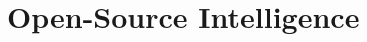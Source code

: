 \begin{comment}
    \item Building on epistemic asymmetry, \textit{technocratic dominance} occurs when a person or a group that has a high level of technical knowledge uses that knowledge to affect the behavior or actions of others in a way that places those affected under a position of diminished power or authority in relation to the former within the specific domain.

    \item Finally, \textit{teleological replacement} describes a situation where a person or a group is successful in substituting in others their own original purpose with that of the social engineer's.
    
\end{itemize}

Together, the six key principles of influence along with their three social engineering extensions provide a psychological framework for social engineering. However, by no means are these exhaustive and as the landscape of social engineering is constantly developing, amendments are likely to be necessary in the future.


\end{comment}



\section{Open-Source Intelligence}
\begin{comment}

    - OSINT, sometimes written as OS-INT?
    - Data from publicly available resources
        - Company website
        - Social networking sites
        - Sites like archive.org and Google archives
        - Observing people in real life
    - Does not include calling the company and asking for information or any other forms of engagement
    - How modern AI augments OSINT gathering is analyzed in the last chapter
        - Exploration of how AI tools and techniques used for the automation and enhancement of OSINT processes
    - Stress the importance of OSINT within SE
    - Ethical considerations when it comes to OSINT
    - Some case studies highlighting the use of OSINT in real-world social engineering incidents?
    - Countermeasures will also be covered later
        - Strategies for companies to mitigate the risks associated with OSINT-based attacks
        - Integration of AI algorithms for analyzing and extracting valuable insights from OSINT data
        - Impact of AI-powered intelligence gathering of SE attacks
        
\end{comment}

